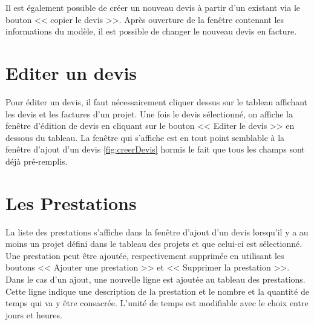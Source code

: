 Il est également possible de créer un nouveau devis à partir d'un existant via le bouton << copier le devis >>. Après ouverture de la fenêtre contenant les informations du modèle, il est possible de changer le nouveau devis en facture. 
\section{Editer un devis}
Pour éditer un devis, il faut nécessairement cliquer dessus sur le tableau affichant les devis et les factures d'un projet. Une fois le devis sélectionné, on affiche la fenêtre d'édition de devis en cliquant sur le bouton << Editer le devis >> en dessous du tableau.
La fenêtre qui s'affiche est en tout point semblable à la fenêtre d'ajout d'un devis \ref{fig:creerDevis} hormis le fait que tous les champs sont déjà pré-remplis.

\section{Les Prestations}
\label{ch:Prestations}
La liste des prestations s'affiche dans la fenêtre d'ajout d'un devis lorsqu'il y a au moins un projet défini dans le tableau des projets et que celui-ci est sélectionné. Une prestation peut être ajoutée, respectivement supprimée en utilisant les boutons << Ajouter une prestation >> et << Supprimer la prestation >>. Dans le cas d'un ajout, une nouvelle ligne est ajoutée au tableau des prestations. Cette ligne indique une description de la prestation et le nombre et la quantité de temps qui va y être consacrée. L'unité de temps est modifiable avec le choix entre jours et heures.


